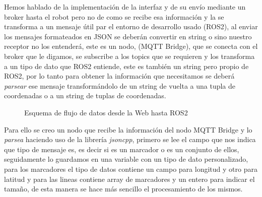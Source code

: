 Hemos hablado de la implementación de la interfaz y de su envío mediante un broker hasta el robot pero no de como se recibe esa información 
y la se transforma a un mensaje útil par el entorno de desarrollo usado (ROS2), al enviar los mensajes formateados en JSON 
se deberán convertir en string o sino nuestro receptor no los entenderá, este es un nodo, (MQTT Bridge), que se conecta con el broker 
que le digamos, se subscribe a los topics que se requieren y los transforma a un tipo de dato que ROS2 entiende, este es también un string pero propio 
de ROS2, por lo  tanto para obtener la información que necesitamos se deberá \textit{parsear} ese mensaje transformándolo de un string de vuelta a una 
tupla de coordenadas o a un string de tuplas de coordenadas.
\begin{figure}[h]
\begin{center}
\end{center}
\caption{Esquema de flujo de datos desde la Web hasta ROS2}
\label{fig:esquema_flujo_datos}
\end{figure}

\newpage
Para ello se creo un nodo que recibe la información del nodo MQTT Bridge y 
lo \textit{parsea} haciendo uso de la librería \textit{jsoncpp}, primero se lee el campo que nos indica que tipo de mensaje es, es 
decir si es un marcador o es un conjunto de ellos, seguidamente lo guardamos en una variable con un tipo de dato personalizado, para los 
marcadores el tipo de datos contiene un campo para longitud y otro para latitud y para las lineas contiene array de marcadores y un entero 
para indicar el tamaño, de esta manera se hace más sencillo el procesamiento de los mismos.



